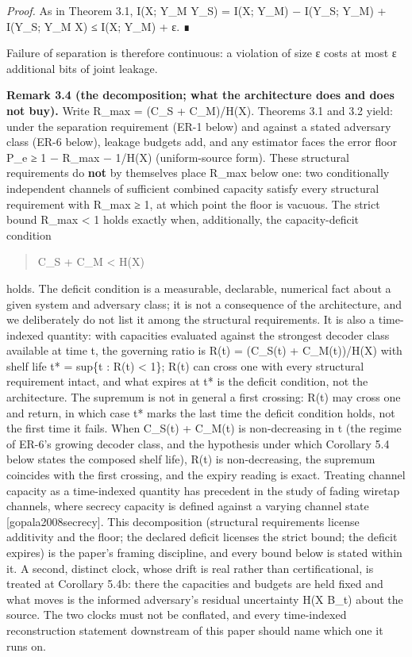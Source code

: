 \documentclass[
  11pt,
]{article}
\begin{document}
\emph{Proof.} As in Theorem 3.1, I(X; Y\_M \textbar{} Y\_S) = I(X; Y\_M)
− I(Y\_S; Y\_M) + I(Y\_S; Y\_M \textbar{} X) ≤ I(X; Y\_M) + ε. ∎

Failure of separation is therefore continuous: a violation of size ε
costs at most ε additional bits of joint leakage.

\textbf{Remark 3.4 (the decomposition; what the architecture does and
does not buy).} Write R\_max = (C\_S + C\_M)/H(X). Theorems 3.1 and 3.2
yield: under the separation requirement (ER-1 below) and against a
stated adversary class (ER-6 below), leakage budgets add, and any
estimator faces the error floor P\_e ≥ 1 − R\_max − 1/H(X)
(uniform-source form). These structural requirements do \textbf{not} by
themselves place R\_max below one: two conditionally independent
channels of sufficient combined capacity satisfy every structural
requirement with R\_max ≥ 1, at which point the floor is vacuous. The
strict bound R\_max \textless{} 1 holds exactly when, additionally, the
capacity-deficit condition

\begin{quote}
C\_S + C\_M \textless{} H(X)
\end{quote}

holds. The deficit condition is a measurable, declarable, numerical fact
about a given system and adversary class; it is not a consequence of the
architecture, and we deliberately do not list it among the structural
requirements. It is also a time-indexed quantity: with capacities
evaluated against the strongest decoder class available at time t, the
governing ratio is R(t) = (C\_S(t) + C\_M(t))/H(X) with shelf life t* =
sup\{t : R(t) \textless{} 1\}; R(t) can cross one with every structural
requirement intact, and what expires at t* is the deficit condition, not
the architecture. The supremum is not in general a first crossing: R(t)
may cross one and return, in which case t* marks the last time the
deficit condition holds, not the first time it fails. When C\_S(t) +
C\_M(t) is non-decreasing in t (the regime of ER-6's growing decoder
class, and the hypothesis under which Corollary 5.4 below states the
composed shelf life), R(t) is non-decreasing, the supremum coincides
with the first crossing, and the expiry reading is exact. Treating
channel capacity as a time-indexed quantity has precedent in the study
of fading wiretap channels, where secrecy capacity is defined against a
varying channel state {[}gopala2008secrecy{]}. This decomposition
(structural requirements license additivity and the floor; the declared
deficit licenses the strict bound; the deficit expires) is the paper's
framing discipline, and every bound below is stated within it. A second,
distinct clock, whose drift is real rather than certificational, is
treated at Corollary 5.4b: there the capacities and budgets are held
fixed and what moves is the informed adversary's residual uncertainty
H(X \textbar{} B\_t) about the source. The two clocks must not be
conflated, and every time-indexed reconstruction statement downstream of
this paper should name which one it runs on.
\end{document}
